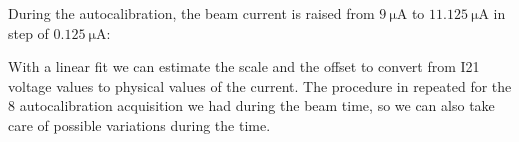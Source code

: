 During the autocalibration, the beam current is raised from $\SI{9}{\micro \ampere}$ to $\SI{11.125}{\micro \ampere}$ in step of $\SI{0.125}{\micro \ampere}$: \newpage

\begin{figure}[ht]
\centering
{}
\end{figure}

With a linear fit we can estimate the scale and the offset to convert from I21 voltage values to physical values of the current. The procedure in repeated for the $8$ autocalibration acquisition we had during the beam time, so we can also take care of possible variations during the time.

\begin{figure}[ht]
\centering
{} \\
\end{figure}

